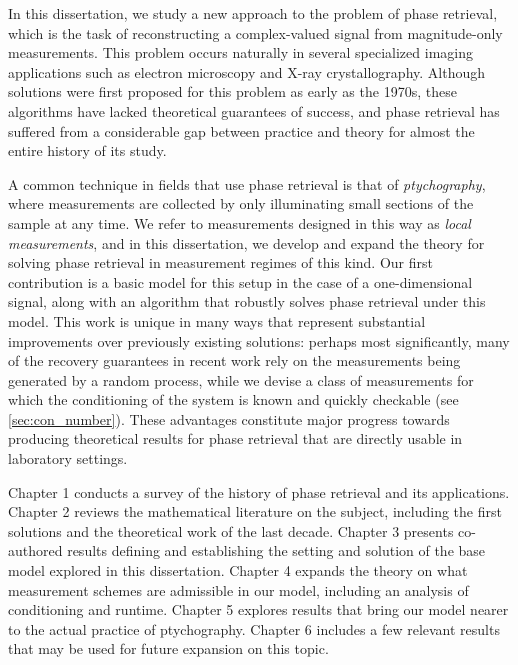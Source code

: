 In this dissertation, we study a new approach to the problem of phase retrieval, which is the task of reconstructing a complex-valued signal from magnitude-only measurements.  This problem occurs naturally in several specialized imaging applications such as electron microscopy and X-ray crystallography.  Although solutions were first proposed for this problem as early as the 1970s, these algorithms have lacked theoretical guarantees of success, and phase retrieval has suffered from a considerable gap between practice and theory for almost the entire history of its study.

A common technique in fields that use phase retrieval is that of \emph{ptychography}, where measurements are collected by only illuminating small sections of the sample at any time.  We refer to measurements designed in this way as \emph{local measurements}, and in this dissertation, we develop and expand the theory for solving phase retrieval in measurement regimes of this kind.  Our first contribution is a basic model for this setup in the case of a one-dimensional signal, along with an algorithm that robustly solves phase retrieval under this model.  This work is unique in many ways that represent substantial improvements over previously existing solutions: perhaps most significantly, many of the recovery guarantees in recent work rely on the measurements being generated by a random process, while we devise a class of measurements for which the conditioning of the system is known and quickly checkable (see \cref{sec:con_number}).  These advantages constitute major progress towards producing theoretical results for phase retrieval that are directly usable in laboratory settings.

Chapter 1 conducts a survey of the history of phase retrieval and its applications.  Chapter 2 reviews the mathematical literature on the subject, including the first solutions and the theoretical work of the last decade.  Chapter 3 presents co-authored results defining and establishing the setting and solution of the base model explored in this dissertation.  Chapter 4 expands the theory on what measurement schemes are admissible in our model, including an analysis of conditioning and runtime.  Chapter 5 explores results that bring our model nearer to the actual practice of ptychography.  Chapter 6 includes a few relevant results that may be used for future expansion on this topic.




